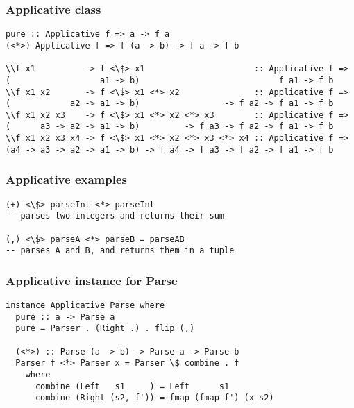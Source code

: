 \documentclass{beamer}
\begin{document}


\begin{frame}
\frametitle{Applicative class}

\begin{lstlisting}
pure :: Applicative f => a -> f a
(<*>) Applicative f => f (a -> b) -> f a -> f b

\\f x1          -> f <\$> x1                      :: Applicative f => (                  a1 -> b)                            f a1 -> f b
\\f x1 x2       -> f <\$> x1 <*> x2               :: Applicative f => (            a2 -> a1 -> b)                 -> f a2 -> f a1 -> f b
\\f x1 x2 x3    -> f <\$> x1 <*> x2 <*> x3        :: Applicative f => (      a3 -> a2 -> a1 -> b)         -> f a3 -> f a2 -> f a1 -> f b
\\f x1 x2 x3 x4 -> f <\$> x1 <*> x2 <*> x3 <*> x4 :: Applicative f => (a4 -> a3 -> a2 -> a1 -> b) -> f a4 -> f a3 -> f a2 -> f a1 -> f b
\end{lstlisting}

\end{frame}


\begin{frame}
\frametitle{Applicative examples}

\begin{lstlisting}
(+) <\$> parseInt <*> parseInt
-- parses two integers and returns their sum

(,) <\$> parseA <*> parseB = parseAB
-- parses A and B, and returns them in a tuple
\end{lstlisting}

\end{frame}


%
%
%


\begin{frame}
\frametitle{Applicative instance for Parse}

\begin{lstlisting}
instance Applicative Parse where
  pure :: a -> Parse a
  pure = Parser . (Right .) . flip (,)

  (<*>) :: Parse (a -> b) -> Parse a -> Parse b
  Parser f <*> Parser x = Parser \$ combine . f
    where
      combine (Left   s1     ) = Left      s1
      combine (Right (s2, f')) = fmap (fmap f') (x s2)
\end{lstlisting}

\end{frame}
\end{document}
